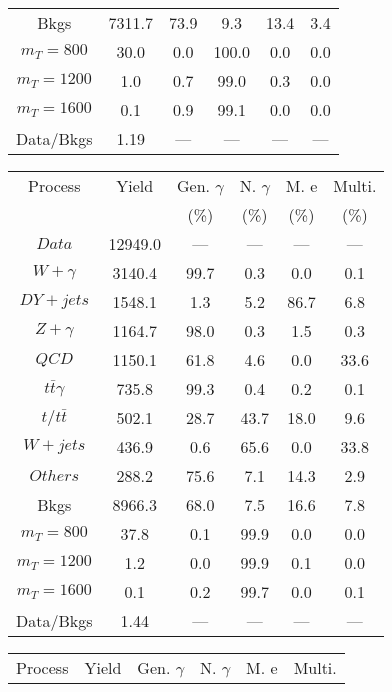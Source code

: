 \begin{figure}
\begin{minipage}[c]{0.32\textwidth}
{\begin{tabular}{cccccc}
Bkgs &  7311.7 &  73.9 &  9.3 &  13.4 &  3.4\\
$ m_{T} = 800 $ &  30.0 &  0.0 &  100.0 &  0.0 &  0.0\\
$ m_{T} = 1200 $ &  1.0 &  0.7 &  99.0 &  0.3 &  0.0\\
$ m_{T} = 1600 $ &  0.1 &  0.9 &  99.1 &  0.0 &  0.0\\
Data/Bkgs &  1.19 &  --- &  --- &  --- &  ---\\
\hline
\end{tabular}
}
\end{minipage}
\begin{minipage}[c]{0.32\textwidth}
\centering
\tiny{
\begin{tabular}{cccccc}
\hline
Process & Yield & Gen. $\gamma$ & N. $\gamma$ & M. e & Multi. \\
 &  & (\%) & (\%) & (\%) & (\%)  \\
\hline
                                                                      $ Data $ &  12949.0 &  --- &  --- &  --- &  ---\\
$ W+\gamma $ &  3140.4 &  99.7 &  0.3 &  0.0 &  0.1\\
$ DY+jets $ &  1548.1 &  1.3 &  5.2 &  86.7 &  6.8\\
$ Z+\gamma $ &  1164.7 &  98.0 &  0.3 &  1.5 &  0.3\\
$ QCD $ &  1150.1 &  61.8 &  4.6 &  0.0 &  33.6\\
$ t\bar{t}\gamma $ &  735.8 &  99.3 &  0.4 &  0.2 &  0.1\\
$ t/t\bar{t} $ &  502.1 &  28.7 &  43.7 &  18.0 &  9.6\\
$ W+jets $ &  436.9 &  0.6 &  65.6 &  0.0 &  33.8\\
$ Others $ &  288.2 &  75.6 &  7.1 &  14.3 &  2.9\\
Bkgs &  8966.3 &  68.0 &  7.5 &  16.6 &  7.8\\
$ m_{T} = 800 $ &  37.8 &  0.1 &  99.9 &  0.0 &  0.0\\
$ m_{T} = 1200 $ &  1.2 &  0.0 &  99.9 &  0.1 &  0.0\\
$ m_{T} = 1600 $ &  0.1 &  0.2 &  99.7 &  0.0 &  0.1\\
Data/Bkgs &  1.44 &  --- &  --- &  --- &  ---\\
\hline
\end{tabular}
}
\end{minipage}
\begin{minipage}[c]{0.32\textwidth}
\centering
\tiny{
\begin{tabular}{cccccc}
\hline
Process & Yield & Gen. $\gamma$ & N. $\gamma$ & M. e & Multi. \\

\end{tabular}}
\end{minipage}
\end{figure}
